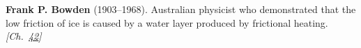 \textbf{Frank P. Bowden} (1903–1968). Australian physicist who demonstrated that the low friction of ice is caused by a water layer produced by frictional heating. \emph{[Ch.~\hyperref[ch:iceslipperiness]{42}]}


